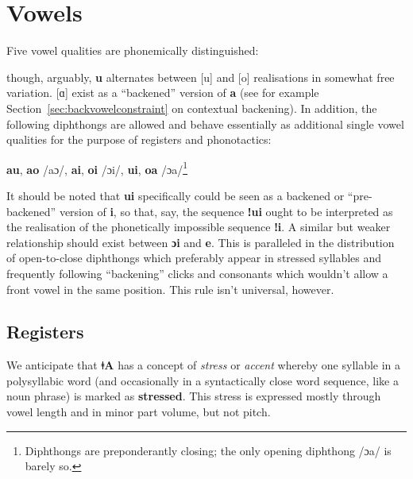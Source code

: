 \documentclass[11pt,a5paper]{book}
\newcommand{\qcn}[1]{\textcolor{AccentText}{\large\textbf{#1}}}
\newcommand{\langname}{\qcn{ǂA}}
\begin{document}
\section{Vowels}

Five vowel qualities are phonemically distinguished:

\begin{center}
    \begin{vowel}
        \putcvowel{\qcn{i}}{1}
        \putcvowel{\qcn{e}}{2}
        \putcvowel{\qcn{a}}{4}
        \putcvowel{\qcn{o} /ɔ/}{6}
        \putcvowel{\qcn{u}}{8}
    \end{vowel}
\end{center}

though, arguably, \qcn{u} alternates between [u] and [o] realisations in somewhat free variation. [ɑ] exist as a ``backened'' version of \qcn{a} (see for example Section~\ref{sec:backvowelconstraint} on contextual backening). In addition, the following diphthongs are allowed and behave essentially as additional single vowel qualities for the purpose of registers and phonotactics:

\begin{center}
\qcn{au}, \qcn{ao} /aɔ/, \qcn{ai}, \qcn{oi} /ɔi/, \qcn{ui}, \qcn{oa} /ɔa/\footnote{Diphthongs are preponderantly closing; the only opening diphthong /ɔa/ is barely so.}
\end{center}

It should be noted that \qcn{ui} specifically could be seen as a backened or ``pre-backened'' version of \qcn{i}, so that, say, the sequence \qcn{ǃui} ought to be interpreted as the realisation of the phonetically impossible sequence \qcn{ǃi}. A similar but weaker relationship should exist between \qcn{ɔi} and \qcn{e}. This is paralleled in the distribution of open-to-close diphthongs which preferably appear in stressed syllables and frequently following ``backening'' clicks and consonants which wouldn't allow a front vowel in the same position. This rule isn't universal, however.

\subsection{Registers}

We anticipate that \langname{} has a concept of \emph{stress} or \emph{accent} whereby one syllable in a polysyllabic word (and occasionally in a syntactically close word sequence, like a noun phrase) is marked as \textbf{stressed}. This stress is expressed mostly through vowel length and in minor part volume, but not pitch.
\end{document}

